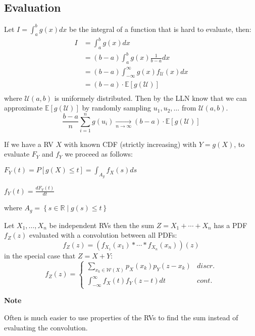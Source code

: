 \documentclass[8pt,a4paper]{extarticle}     %
\newcommand{\R}{\mathbb{R}}
\newcommand{\colfill}{\vfill\eject\columnbreak}
\begin{document}
\begin{multicols}{4}
\subsection{Evaluation}
\begin{boxguide} 
	Let $I=\int_{a}^{b}g(x)dx$ be the integral of a function that is hard to evaluate, then:
	\[
		\begin{split}
			I &=\int_{a}^{b}g(x)dx \\ 
			&= (b-a)\int_{a}^{b}g(x)\frac{1}{b-a}dx \\ 
			&= (b-a)\int_{-\infty}^{\infty}g(x)f_\mathcal{U}(x)dx \\ 
			&= (b-a)\cdot\mathbb{E}\left[g(\mathcal{U})\right] \\ 
		\end{split}
	\]
	where $\mathcal{U}(a,b)$ is uniformely distributed. Then by the LLN know that we can approximate $\mathbb{E}\left[g(\mathcal{U})\right]$ by randomly sampling $u_1,u_2,\dots$ from $\mathcal{U}(a,b)$. 
	\[
		\frac{b-a}{n}\sum_{i=1}^{n} g(u_i)\xrightarrow[n\rightarrow\infty]{} (b-a)\cdot\mathbb{E}\left[g(\mathcal{U})\right]
	\]
\end{boxguide}
\begin{boxguide}[Transformation] 
	If we have a RV $X$ with known CDF (strictly increasing) with $Y=g(X)$, to evaluate $F_Y$ and $f_Y$ we proceed as follows: 
	\begin{listnr}
		\item $F_Y(t)=P[g(X)\leq t]=\int_{A_g}f_X(s)ds$ 
		\item $f_Y(t)=\frac{dF_Y(t)}{dt}$
	\end{listnr}
	where $A_g=\left\{s\in\R \mid g(s)\leq t\right\}$
\end{boxguide}
\begin{boxguide} 
	Let $X_1,\dots,X_n$ be independent RVs then the sum $Z=X_1+\cdots+X_n$ has a PDF $f_Z(z)$ evaluated with a convolution between all PDFs:
	\[
		f_Z(z) = (f_{X_1}(x_1)\ast\cdots\ast f_{X_n}(x_n))(z)
	\]
	in the special case that $Z=X+Y$: 
	\[
		f_Z(z)=
		\begin{cases}
			\displaystyle \sum_{x_k\in\mathcal{W}(X)}p_X(x_k)p_Y(z-x_k)  & \textit{discr.} \\[2em]
			\displaystyle \int_{-\infty}^{\infty} f_{X}(t)f_{Y}(z-t) dt & \textit{cont.}
		\end{cases}
	\]
\end{boxguide}
\begin{listb}
	\item [] \textbf{Note}
	\item Often is much easier to use properties of the RVs to find the sum instead of evaluating the convolution. 
\end{listb}
\colfill


\end{multicols}
\end{document}
